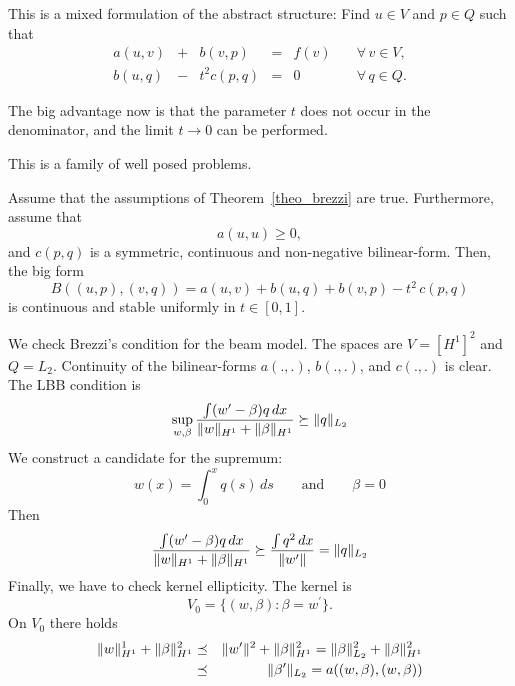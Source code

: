 This is a mixed formulation of the abstract structure: Find $u \in V$ and $p \in Q$ such
that
\begin{equation}
\begin{array}{ccccll}
a(u,v) & + & b(v,p) & = & f(v) \quad & \forall \, v \in V, \\[0.2em]
b(u,q) & - & t^2 c(p,q) & = & 0 \quad & \forall \, q \in Q.
\end{array}
\end{equation}

The big advantage now is that the parameter $t$ does not occur in the denominator,
and the limit $t \rightarrow 0$ can be performed. 

This is a family of well posed problems. 
\begin{theorem} Assume that the assumptions of Theorem~\ref{theo_brezzi}
are true. Furthermore, assume that
$$
a(u,u) \geq 0,
$$
and $c(p,q)$ is a symmetric, continuous and non-negative bilinear-form. 
Then, the big form
$$
B((u,p),(v,q)) = a(u,v) + b(u,q) + b(v,p) - t^2 \, c(p,q)
$$
is continuous and stable uniformly in $t \in [0,1]$.
\end{theorem}

We check Brezzi's condition for the beam model. The spaces are $V = [H^1]^2$
and $Q = L_2$. Continuity of the bilinear-forms $a(.,.)$, $b(.,.)$, and $c(.,.)$
is clear. The LBB condition is
$$
\sup_{w,\beta} \frac{ \int (w^\prime - \beta) q \, dx } { \| w \|_{H^1} + \| \beta \|_{H^1} }
\succeq \| q \|_{L_2}
$$
We construct a candidate for the supremum: 
$$
w(x) = \int_0^x q(s) \, ds \qquad \mbox{and} \qquad \beta = 0
$$
Then
$$
\frac{ \int (w^\prime - \beta) q \, dx } { \| w \|_{H^1} + \| \beta \|_{H^1} }
\succeq \frac{ \int q^2 \, dx } { \| w^\prime \| } = \| q \|_{L_2}
$$
Finally, we have to check kernel ellipticity. The kernel is
$$
V_0 = \{ (w, \beta) : \beta = w^\prime \}.
$$
On $V_0$ there holds
\begin{eqnarray*}
\| w \|_{H^1}^1 + \| \beta \|_{H^1}^2 & \preceq & \| w^\prime \|^2 + \| \beta \|_{H^1}^2 
= \| \beta \|_{L_2}^2 + \| \beta \|_{H^1}^2 \\
& \preceq & \| \beta^\prime \|_{L_2} 
=  a((w,\beta), (w, \beta))
\end{eqnarray*}

